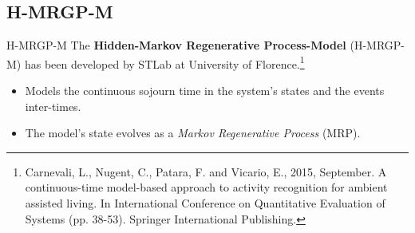 \documentclass[9pt, handout]{beamer}
\begin{document}
    \subsection{H-MRGP-M}
      \begin{frame}{H-MRGP-M}
        \pause
        The \textbf{Hidden-Markov Regenerative Process-Model} (H-MRGP-M) has been developed by STLab at University of Florence.\footnote{Carnevali, L., Nugent, C., Patara, F. and Vicario, E., 2015, September. A continuous-time model-based approach to activity recognition for ambient assisted living. In International Conference on Quantitative Evaluation of Systems (pp. 38-53). Springer International Publishing.}
        
        \pause
        \begin{itemize}
          \item Models the continuous sojourn time in the system's states and the events inter-times.
          \pause
          \item The model's state evolves as a \textit{Markov Regenerative Process} (MRP).
        \end{itemize}
      \end{frame}
      
\end{document}
